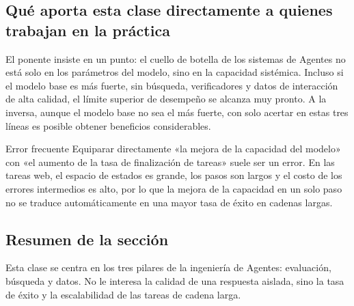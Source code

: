 \subsection{Qué aporta esta clase directamente a quienes trabajan en la práctica}
El ponente insiste en un punto: el cuello de botella de los sistemas de Agentes no está solo en los parámetros del modelo, sino en la capacidad sistémica. Incluso si el modelo base es más fuerte, sin búsqueda, verificadores y datos de interacción de alta calidad, el límite superior de desempeño se alcanza muy pronto. A la inversa, aunque el modelo base no sea el más fuerte, con solo acertar en estas tres líneas es posible obtener beneficios considerables.

\begin{warningbox}{Error frecuente}
Equiparar directamente «la mejora de la capacidad del modelo» con «el aumento de la tasa de finalización de tareas» suele ser un error. En las tareas web, el espacio de estados es grande, los pasos son largos y el costo de los errores intermedios es alto, por lo que la mejora de la capacidad en un solo paso no se traduce automáticamente en una mayor tasa de éxito en cadenas largas.
\end{warningbox}

\subsection{Resumen de la sección}
Esta clase se centra en los tres pilares de la ingeniería de Agentes: evaluación, búsqueda y datos. No le interesa la calidad de una respuesta aislada, sino la tasa de éxito y la escalabilidad de las tareas de cadena larga.


